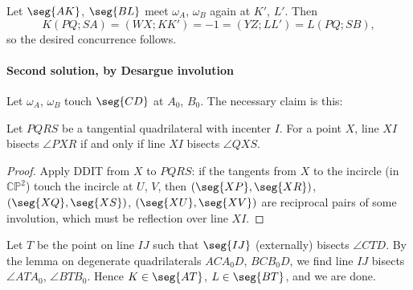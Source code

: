 Let $\seg{AK}$, $\seg{BL}$ meet $\omega_A$, $\omega_B$ again at $K'$, $L'$. Then \[K(PQ;SA)=(WX;KK')=-1=(YZ;LL')=L(PQ;SB),\]
so the desired concurrence follows.

\paragraph{Second solution, by Desargue involution} Let $\omega_A$, $\omega_B$ touch $\seg{CD}$ at $A_0$, $B_0$. The necessary claim is this:
\begin{lemma*}
    Let $PQRS$ be a tangential quadrilateral with incenter $I$. For a point $X$, line $XI$ bisects $\angle PXR$ if and only if line $XI$ bisects $\angle QXS$.
\end{lemma*}
\begin{proof}
    Apply DDIT from $X$ to $PQRS$: if the tangents from $X$ to the incircle (in $\mathbb C\mathbb P^2$) touch the incircle at $U$, $V$, then $(\seg{XP},\seg{XR})$, $(\seg{XQ},\seg{XS})$, $(\seg{XU},\seg{XV})$ are reciprocal pairs of some involution, which must be reflection over line $XI$.
\end{proof}

Let $T$ be the point on line $IJ$ such that $\seg{IJ}$ (externally) bisects $\angle CTD$. By the lemma on degenerate quadrilaterals $ACA_0D$, $BCB_0D$, we find line $IJ$ bisects $\angle ATA_0$, $\angle BTB_0$. Hence $K\in\seg{AT}$, $L\in\seg{BT}$, and we are done.

